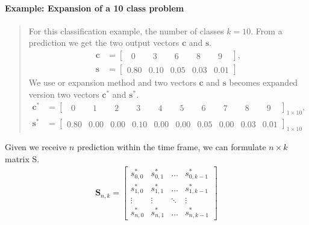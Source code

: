 \paragraph{Example: Expansion of a 10 class problem} 
\blockquote[]{	 	
	For this classification example, the number of classes $k=10$. From a prediction we get the two output vectors $\mathbf{c}$ and $\mathbf{s}$.
	\begin{align*}
	\mathbf{c} &= \begin{bmatrix}
	\phantom{0}0\phantom{.0} & \phantom{0}3\phantom{.0} & \phantom{0}6\phantom{.0} & \phantom{0}8\phantom{.0} & \phantom{0}9\phantom{.0}
	\end{bmatrix},\\
	\mathbf{s} &= \begin{bmatrix}
	0.80 & 0.10 & 0.05 & 0.03 & 0.01
	\end{bmatrix}
	\end{align*}
	We use or expansion method and two vectors $\mathbf{c}$ and $\mathbf{s}$ becomes expanded version two vectors $\mathbf{c^*}$ and $\mathbf{s^*}$.
	\begin{align*}
	\mathbf{c^*} &= \begin{bmatrix}
	\phantom{0}0\phantom{.0} & \phantom{0}1\phantom{.0} & \phantom{0}2\phantom{.0} & \phantom{0}3\phantom{.0} & \phantom{0}4\phantom{.0} & \phantom{0}5\phantom{.0} & \phantom{0}6\phantom{.0} & \phantom{0}7\phantom{.0} & \phantom{0}8\phantom{.0} & \phantom{0}9\phantom{.0}
	\end{bmatrix}_{1 \times 10},\\
	\mathbf{s^*} &= \begin{bmatrix}
	0.80 & 0.00 & 0.00 & 0.10 & 0.00 & 0.00 & 0.05 & 0.00 & 0.03 & 0.01
	\end{bmatrix}_{1 \times 10}
	\end{align*}
}
Given we receive $n$ prediction within the time frame, we can formulate $n \times k$ matrix S. 
\begin{align*}
\mathbf{S}_{n,k} = \begin{bmatrix}
s^*_{0,0} & s^*_{0,1} & \dots  & s^*_{0,k-1} 	\\
s^*_{1,0} & s^*_{1,1} & \dots  & s^*_{1,k-1}	\\
\vdots 	& \vdots  & \ddots & \vdots 	\\
s^*_{n,0} & s^*_{n,1} & \dots  & s^*_{n,k-1}
\end{bmatrix}
\end{align*}      

